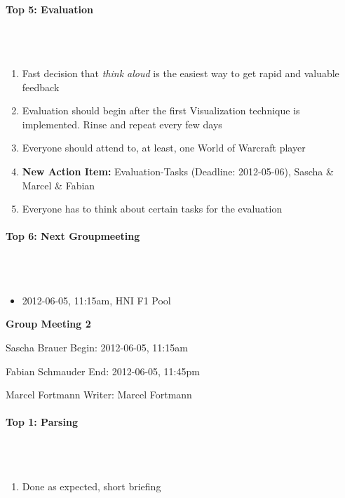 \documentclass{scrartcl}
\begin{document}
\paragraph{Top 5: Evaluation}
\hfill \\ \hfill \\
\begin {enumerate}
\item Fast decision that \textit{think aloud} is the easiest way to get rapid and valuable feedback
\item Evaluation should begin after the first Visualization technique is implemented. Rinse and repeat every few days
\item Everyone should attend to, at least, one World of Warcraft player
\item \textbf{New Action Item:} Evaluation-Tasks (Deadline: 2012-05-06), Sascha \& Marcel \& Fabian
\item Everyone has to think about certain tasks for the evaluation
\end {enumerate}

\paragraph{Top 6: Next Groupmeeting}
\hfill \\ \hfill \\
\begin{itemize}
\item 2012-06-05, 11:15am, HNI F1 Pool
\end{itemize}

\clearpage

\begin{center}
{\huge \textbf{Group Meeting 2}}\\
\end{center}
\begin{description}
\item Sascha Brauer \hfill Begin: 2012-06-05, 11:15am 
\item Fabian Schmauder \hfill End: 2012-06-05, 11:45pm
\item Marcel Fortmann \hfill Writer: Marcel Fortmann
\end{description}

\paragraph{Top 1: Parsing}
\hfill \\ \hfill \\
\begin {enumerate}
\item Done as expected, short briefing
\end {enumerate}
\end{document}
